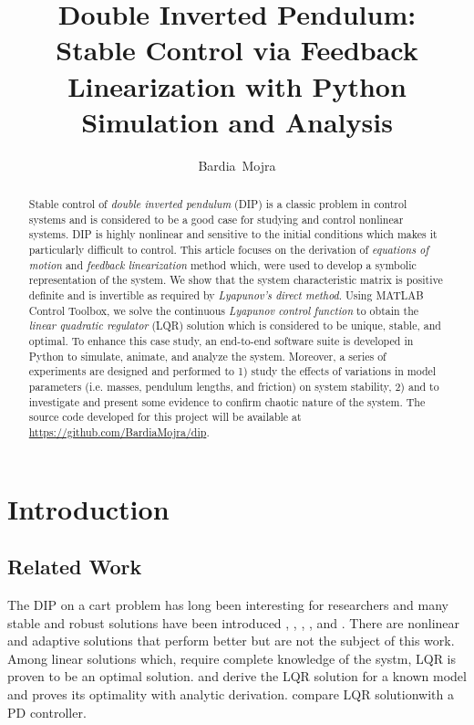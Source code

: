 \documentclass[journal]{IEEEtran}
\begin{document}
\title{Double Inverted Pendulum: \\
Stable Control via Feedback Linearization with
Python Simulation and Analysis}
\author{Bardia~Mojra}
\maketitle

\begin{abstract}
Stable control of \emph{double inverted pendulum} (DIP) is a classic problem in
control systems and is considered to be a good case for studying and control
nonlinear systems.
DIP is highly nonlinear and sensitive to
the initial conditions which makes it particularly difficult to control.
This article focuses on the derivation of
\emph{equations of motion} and \emph{feedback linearization} method which,
were used to develop a symbolic representation of the system. We show that the
system characteristic matrix is positive definite and is invertible as required
by \emph{Lyapunov's direct method}. Using MATLAB
Control Toolbox, we solve the continuous \emph{Lyapunov control function} to
obtain the \emph{linear quadratic regulator} (LQR) solution which is considered
to be unique, stable, and optimal. To enhance this case study,
an end-to-end software suite is developed in Python to simulate, animate, and
analyze the system.
Moreover, a series of experiments are designed and performed to 1) study the
effects of variations in model
parameters (i.e. masses, pendulum lengths, and friction) on system stability,
2) and to investigate and present some evidence
to confirm chaotic nature of the system.
The source code developed for this project will be available at \href{https://github.com/BardiaMojra/dip}{https://github.com/BardiaMojra/dip}.
\end{abstract}



\section{Introduction}


\subsection{Related Work}
The DIP on a cart problem has long been interesting for researchers and many
stable and robust solutions have been introduced \cite{ibanez2005lyapunov},
\cite{optimalLQR}, \cite{dabretau2015control}, \cite{crowe2018control},
and \cite{mehedi2020three}.
There are nonlinear and adaptive solutions that perform better but are not
the subject of this work. Among linear solutions which, require complete knowledge
of the systm, LQR is proven to be an optimal solution.
\cite{optimalLQR} and \cite{mehedi2020three} derive the LQR solution for a
known model and proves its optimality with analytic derivation.
\cite{crowe2018control} compare LQR solutionwith a PD controller.
\end{document}
